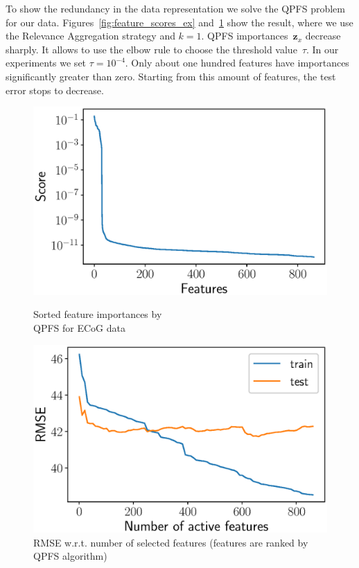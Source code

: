 \documentclass[12pt,twoside]{article}
\theoremstyle{definition}
\newcommand{\bz}{\mathbf{z}}
\begin{document}
To show the redundancy in the data representation we solve the QPFS problem for our data.
Figures~\ref{fig:feature_scores_ex} and~\ref{fig:train_test_qpfs} show the result, where we use the Relevance Aggregation strategy and $k = 1$.
QPFS importances~$\bz_x$ decrease sharply.
It allows to use the elbow rule to choose the threshold value~$\tau$. 
In our experiments we set $\tau = 10^{-4}$. 
Only about one hundred features have importances significantly greater than zero.
Starting from this amount of features, the test error stops to decrease.
\begin{figure}[h]
	\begin{minipage}{.5\linewidth}
		\centering
		\includegraphics[width=\linewidth]{figs/feature_scores_ex.eps}
		\caption{Sorted feature importances by \\ QPFS for ECoG data}
		\label{fig:feature_scores_ex}
	\end{minipage}%
	\begin{minipage}{.5\linewidth}
		\centering
		\includegraphics[width=\linewidth]{figs/train_test_qpfs.eps}
		\caption{RMSE w.r.t. number of selected features (features are ranked by QPFS algorithm)}
		\label{fig:train_test_qpfs}
	\end{minipage}
\end{figure}
\end{document}
